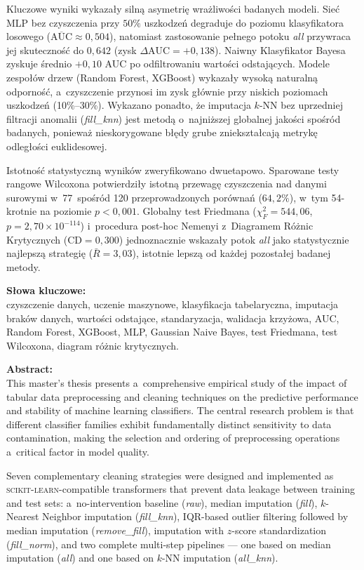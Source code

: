 Kluczowe wyniki wykazały silną asymetrię wrażliwości badanych modeli. Sieć MLP bez czyszczenia przy $50\%$ uszkodzeń degraduje do poziomu klasyfikatora losowego ($\overline{\mathrm{AUC}} \approx 0{,}504$), natomiast zastosowanie pełnego potoku \textit{all} przywraca jej skuteczność do $0{,}642$ (zysk $\Delta\mathrm{AUC} = {+}0{,}138$). Naiwny Klasyfikator Bayesa zyskuje średnio $+0{,}10$ AUC po odfiltrowaniu wartości odstających. Modele zespołów drzew (Random Forest, XGBoost) wykazały wysoką naturalną odporność, a~czyszczenie przynosi im zysk głównie przy niskich poziomach uszkodzeń (10\%--30\%). Wykazano ponadto, że imputacja $k$-NN bez uprzedniej filtracji anomalii (\textit{fill\_knn}) jest metodą o~najniższej globalnej jakości spośród badanych, ponieważ nieskorygowane błędy grube zniekształcają metrykę odległości euklidesowej.

Istotność statystyczną wyników zweryfikowano dwuetapowo. Sparowane testy rangowe Wilcoxona potwierdziły istotną przewagę czyszczenia nad danymi surowymi w~77~spośród 120 przeprowadzonych porównań ($64{,}2\%$), w~tym 54-krotnie na poziomie $p < 0{,}001$. Globalny test Friedmana ($\chi^2_F = 544{,}06$, $p = 2{,}70 \times 10^{-114}$) i~procedura post-hoc Nemenyi z~Diagramem Różnic Krytycznych ($\mathrm{CD} = 0{,}300$) jednoznacznie wskazały potok \textit{all} jako statystycznie najlepszą strategię ($\bar{R} = 3{,}03$), istotnie lepszą od każdej pozostałej badanej metody.

\vspace{0.4cm}
\noindent \textbf{Słowa kluczowe:}\\
czyszczenie danych, uczenie maszynowe, klasyfikacja tabelaryczna, imputacja braków danych, wartości odstające, standaryzacja, walidacja krzyżowa, AUC, Random Forest, XGBoost, MLP, Gaussian Naive Bayes, test Friedmana, test Wilcoxona, diagram różnic krytycznych.

\vspace{0.8cm}
\noindent \textbf{Abstract:}\\
This master's thesis presents a~comprehensive empirical study of the impact of tabular data preprocessing and cleaning techniques on the predictive performance and stability of machine learning classifiers. The central research problem is that different classifier families exhibit fundamentally distinct sensitivity to data contamination, making the selection and ordering of preprocessing operations a~critical factor in model quality.

Seven complementary cleaning strategies were designed and implemented as \textsc{scikit-learn}-compatible transformers that prevent data leakage between training and test sets: a~no-intervention baseline (\textit{raw}), median imputation (\textit{fill}), $k$-Nearest Neighbor imputation (\textit{fill\_knn}), IQR-based outlier filtering followed by median imputation (\textit{remove\_fill}), imputation with $z$-score standardization (\textit{fill\_norm}), and two complete multi-step pipelines --- one based on median imputation (\textit{all}) and one based on $k$-NN imputation (\textit{all\_knn}).

